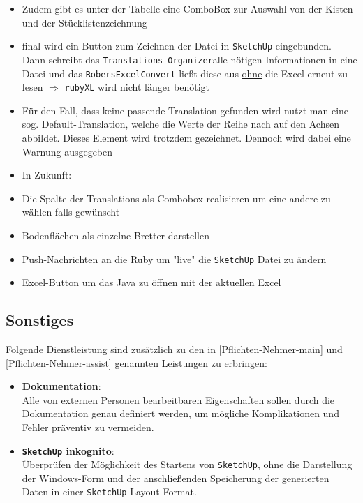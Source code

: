 \documentclass[a4paper,12pt]{article}
\newcommand{\robersexcelconvert}{\texttt{RobersExcelConvert}\xspace}
\newcommand{\assisttool}{\texttt{Translations Organizer}}
\newcommand{\sketchup}{\texttt{SketchUp}\xspace}
\begin{document}
\begin{itemize}
\begin{figure}[H]
\begin{tabular}{|c|c|c|c|c|c|c|}
							\dots & \dots & \dots & \dots & \dots & \dots & \dots 
						\end{tabular}
					\end{figure}
				\item Zudem gibt es unter der Tabelle eine ComboBox zur Auswahl von der Kisten- und der Stücklistenzeichnung
				\item final wird ein Button zum Zeichnen der Datei in \sketchup eingebunden. Dann schreibt das \assisttool alle nötigen Informationen in eine Datei und das \robersexcelconvert ließt diese aus \underline{ohne} die Excel erneut zu lesen $\Rightarrow$ \texttt{rubyXL} wird nicht länger benötigt
				\item Für den Fall, dass keine passende Translation gefunden wird nutzt man eine sog. Default-Translation, welche die Werte der Reihe nach auf den Achsen abbildet. Dieses Element wird trotzdem gezeichnet. Dennoch wird dabei eine Warnung ausgegeben
				
				\item[] In Zukunft:
				\item Die Spalte der Translations als Combobox realisieren um eine andere zu wählen falls gewünscht
				\item Bodenflächen als einzelne Bretter darstellen
				\item Push-Nachrichten an die Ruby um "live" die \sketchup Datei zu ändern
				\item Excel-Button um das Java zu öffnen mit der aktuellen Excel
			\end{itemize}
		\subsection{Sonstiges} \label{Pflichten-sonstiges}
			Folgende Dienstleistung sind zusätzlich zu den in \ref{Pflichten-Nehmer-main} und \ref{Pflichten-Nehmer-assist} genannten Leistungen zu erbringen:
			\begin{itemize}
				\item \textbf{Dokumentation}: \\
					Alle von externen Personen bearbeitbaren Eigenschaften sollen durch die Dokumentation genau definiert werden, um mögliche Komplikationen und Fehler präventiv zu vermeiden.
				\item \textbf{\sketchup inkognito}: \label{incognito}\\
					Überprüfen der Möglichkeit des Startens von \sketchup, ohne die Darstellung der Windows-Form und der anschließenden Speicherung der generierten Daten in einer \sketchup-Layout-Format.
			\end{itemize}
\end{document}

